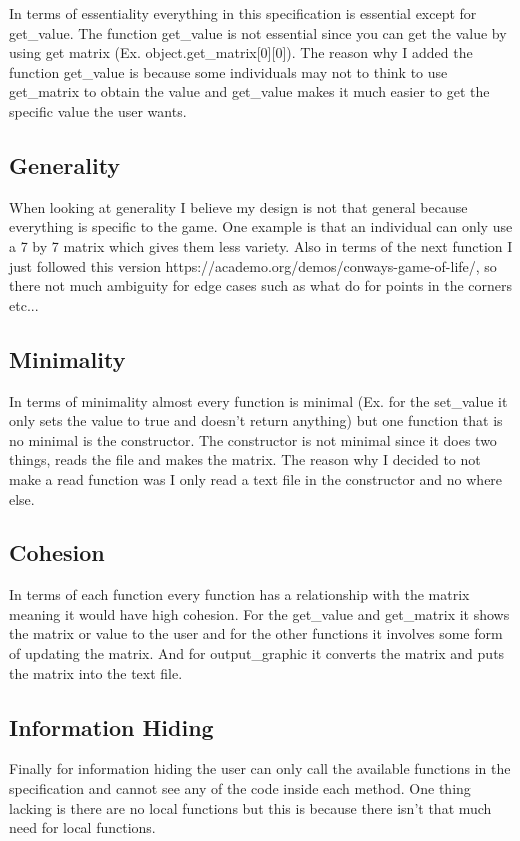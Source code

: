 \documentclass[12pt]{article}
\begin{document}
In terms of essentiality everything in this specification is essential except for get\_value. The function get\_value is not essential since you can get the value by using get matrix (Ex. object.get\_matrix[0][0]). The reason why I added the function get\_value is because some individuals may not to think to use get\_matrix to obtain the value and get\_value makes it much easier to get the specific value the user wants.

\subsection*{Generality}
When looking at generality I believe my design is not that general because everything is specific to the game. One example is that an individual can only use a 7 by 7 matrix which gives them less variety. Also in terms of the next function I just followed this version https://academo.org/demos/conways-game-of-life/, so there not much ambiguity for edge cases such as what do for points in the corners etc... 

\subsection*{Minimality}
In terms of minimality almost every function is minimal (Ex. for the set\_value it only sets the value to true and doesn't return anything) but one function that is no minimal is the constructor. The constructor is not minimal since it does two things, reads the file and makes the matrix. The reason why I decided to not make a read function was I only read a text file in the constructor and no where else.

\subsection*{Cohesion}
In terms of each function every function has a relationship with the matrix meaning it would have high cohesion. For the get\_value and get\_matrix it shows the matrix or value to the user and for the other functions it involves some form of updating the matrix. And for output\_graphic it converts the matrix and puts the matrix into the text file.

\subsection*{Information Hiding}
Finally for information hiding the user can only call the available functions in the specification and cannot see any of the code inside each method. One thing lacking is there are no local functions but this is because there isn't that much need for local functions.
\end{document}
